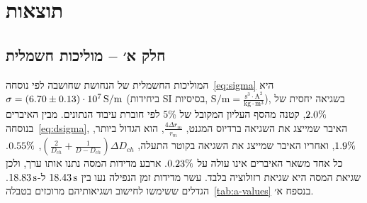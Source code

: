 \documentclass[10pt,a4paper]{article}
\newcommand{\textenglish}[1]{\foreignlanguage{english}{#1}}
\newcommand{\U}[1]{\,\mathrm{#1}}
\begin{document}
\section*{תוצאות}
\subsection*{חלק א׳ -- מוליכות חשמלית}
המוליכות החשמלית של הנחושת שחושבה לפי נוסחה~\eqref{eq:sigma} היא $\sigma = \SigmaVal\U{S/m}$ (ביחידות \textenglish{SI} בסיסיות, $\mathrm{S/m} = \frac{\mathrm{s^{3}\cdot A^{2}}}{\mathrm{kg\cdot m^{3}}}$), בשגיאה יחסית של $2.0\%$, קטנה מהסף העליון המקובל של 5\% לפי חוברת עיבוד הנתונים. מבין האיברים בנוסחה~\eqref{eq:dsigma}, האיבר שמייצג את השגיאה ברדיוס המגנט, $\frac{4\Delta r_m}{r_m}$, הוא הגדול ביותר, $1.9\%$, ואחריו האיבר שמייצג את השגיאה בקוטר התעלה, $\left(\frac{2}{D_{ch}} + \frac{1}{D - D_{ch}}\right)\Delta D_{ch}$, $0.55\%$. כל אחד משאר האיברים אינו עולה על $0.23\%$. ארבע מדידות המסה נתנו אותו ערך, ולכן שגיאת המסה היא שגיאת רזולוציה בלבד. עשר מדידות זמן הנפילה נעו בין $\ATMin\U{s}$ ל-$\ATMax\U{s}$. הגדלים ששימשו לחישוב ושגיאותיהם מרוכזים בטבלה~\ref{tab:a-values} בנספח א׳.
\end{document}
